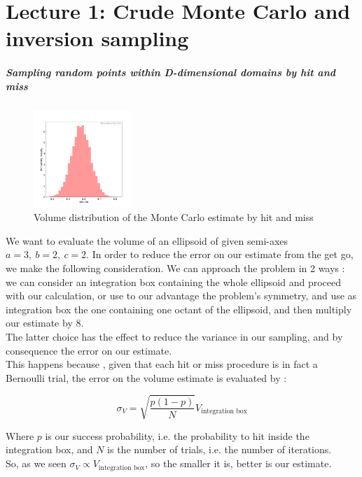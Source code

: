 \chapter*{Lecture 1: Crude Monte Carlo and inversion sampling}

\paragraph{Sampling random points within D-dimensional domains by hit and miss}


\begin{figure}
    \vspace{-25pt}
    \centering
    \includegraphics[width=0.33\textwidth]{FIG/exercise_0_images/first_ellipsoid_distribution.png}
  \caption{Volume distribution of the Monte Carlo estimate by hit and miss}
  \label{lec1:first_ellipsoid}
  \end{figure}

We want to evaluate the volume of an ellipsoid of given semi-axes $a=3,\ b=2,\ c=2$. 
In order to reduce the error on our estimate from the get go, we make the following consideration. We can approach the problem in 2 ways : 
we can consider an integration box containing the whole ellipsoid and proceed with our calculation, or use to our advantage the problem's symmetry, 
and use as integration box the one containing one octant of the ellipsoid, and then multiply our estimate by 8. \\
The latter choice has the effect to reduce the variance in our sampling, and by consequence the error on our estimate. \\
This happens because , given that each hit or miss procedure is in fact a Bernoulli trial, the error on the volume estimate is evaluated by :

$$ \sigma_V = \sqrt{\frac{p( 1-p )}{N}} V_{\text{integration box}} $$

Where $p$ is our success probability, i.e. the probability to hit inside the integration box, and $N$ is the number of trials, i.e. the number of iterations.\\
So, as we seen $\sigma_V \propto V_{\text{integration box}}$, so the smaller it is, better is our estimate.


